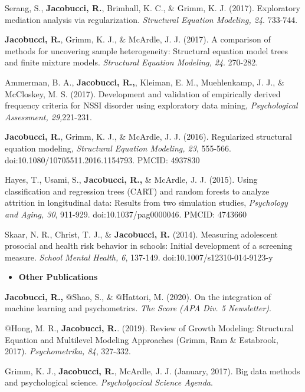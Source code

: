 \documentclass[letterpaper,10pt]{article}
\begin{document}
\begin{etaremune}
	\item Serang, S., \textbf{Jacobucci, R.}, Brimhall, K. C., \& Grimm, K. J. (2017). Exploratory mediation analysis via regularization. \emph{Structural Equation Modeling, 24}. 733-744.
	\item \textbf{Jacobucci, R.}, Grimm, K. J., \& McArdle, J. J. (2017). A comparison of methods for uncovering sample heterogeneity: Structural equation model trees and finite mixture models. \emph{Structural Equation Modeling, 24}. 270-282.
	\item Ammerman, B. A., \textbf{Jacobucci, R.,}, Kleiman, E. M., Muehlenkamp, J. J., \& McCloskey, M. S. (2017). Development and validation of empirically derived frequency criteria for NSSI disorder using exploratory data mining, \emph{Psychological Assessment, 29,}221-231.
	\item \textbf{Jacobucci, R.}, Grimm, K. J., \& McArdle, J. J. (2016). Regularized structural equation modeling, \emph{Structural Equation Modeling, 23}, 555-566. doi:10.1080/10705511.2016.1154793. PMCID: 4937830
	\item Hayes, T., Usami, S., \textbf{Jacobucci, R.,} \& McArdle, J. J. (2015). Using classification and regression trees (CART) and random forests to analyze attrition in longitudinal data: Results from two simulation studies, \emph{Psychology and Aging, 30}, 911-929. doi:10.1037/pag0000046. PMCID: 4743660
	\item Skaar, N. R., Christ, T. J., \& \textbf{Jacobucci, R.} (2014). Measuring adolescent prosocial and health risk behavior in schools: Initial development of a screening measure. \emph{School Mental Health, 6}, 137-149. doi:10.1007/s12310-014-9123-y
	
\end{etaremune}
%
\vspace{3mm}
\begin{itemize}
	\item {\textbf{\large{Other Publications}}}
\end{itemize}
\begin{etaremune}
	\item  \textbf{Jacobucci, R.,} $@$Shao, S., \& $@$Hattori, M. (2020). On the integration of machine learning and psychometrics. \emph{The Score (APA Div. 5 Newsletter)}.
	\item  $@$Hong, M. R., \textbf{Jacobucci, R.}. (2019). Review of Growth Modeling: Structural Equation and Multilevel Modeling Approaches (Grimm, Ram \& Estabrook, 2017). \emph{Psychometrika, 84}, 327-332.
	\item Grimm, K. J., \textbf{Jacobucci, R.}, McArdle, J. J. (January, 2017). Big data methods and psychological science. \emph{Psycholgocical Science Agenda}.
	
\end{etaremune}
\end{document}

